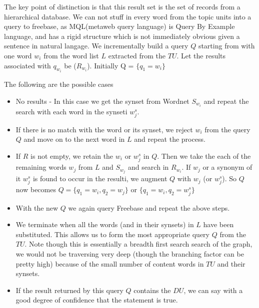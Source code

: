 \documentclass[11pt]{article}
\begin{document}
The key point of distinction is that this result set is the set of records from a hierarchical database. We can not stuff in every word from the topic units into a query to freebase, as MQL(metaweb query language) is Query By Example language, and has a rigid structure which is not immediately obvious given a sentence in natural langage. We incrementally build a query $Q$ starting from with one word $w_{i}$ from the word list $L$ extracted from the $TU$. Let the results associated with $q_{w_{i}}$ be ($R_{w_{i}}$). Initially Q = $\{q_{1}=w_{i}\}$

 The following are the possible cases
\begin{itemize}
\item No results - In this case we get the synset from Wordnet $S_{w_{i}}$ and repeat the search with each word in the synseti $w_{j}^{s}$.
\item If there is no match with the word or its synset, we reject $w_{i}$ from the query $Q$ and move on to the next word in $L$ and repeat the process.
\item If $R$ is not empty, we retain the $w_{i}$ or $w_{j}^{s}$ in $Q$. Then we take the each of the remaining words $w_{j}$ from $L$ and $S_{w_{j}}$ and search in $R_{w_{i}}$. If $w_{j}$ or a synonym of it $w_{j}^{s}$ is found to occur in the resulti, we augment $Q$ with $w_{j}$ (or $w_{j}^{s}$). So $Q$ now becomes $Q =\{q_{1}=w_{i}, q_{2}=w_{j}\}$ or $\{q_{1}=w_{i},q_{2}=w_{j}^{s}\}$ 
\item With the new $Q$ we again query Freebase and repeat the above steps.
\item We terminate when all the words (and in their synsets) in $L$ have been substituted. This allows us to form the most appropriate query $Q$ from the $TU$. Note though this is essentially a breadth first search search of the graph, we would not be traversing very deep (though the branching factor can be pretty high) because of the small number of content words in $TU$ and their synsets.
\item If the result returned by this query $Q$ contains the $DU$, we can say with a good degree of confidence that the statement is true.    
\end{itemize}
%
%
\end{document}
